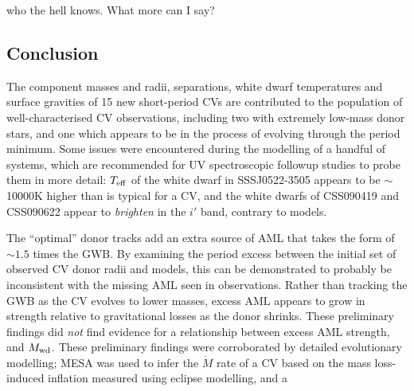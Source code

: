 \label{chpt:conclusion} %

who the hell knows. What more can I say?

\subsection{Conclusion}

The component masses and radii, separations, white dwarf temperatures and surface gravities of 15 new short-period CVs are contributed to the population of well-characterised CV observations, including two with extremely low-mass donor stars, and one which appears to be in the process of evolving through the period minimum.
Some issues were encountered during the modelling of a handful of systems, which are recommended for UV spectroscopic followup studies to probe them in more detail: $T_{\rm eff}$ of the white dwarf in SSSJ0522-3505 appears to be $\sim$10000K higher than is typical for a CV, and the white dwarfs of CSS090419 and CSS090622 appear to \textit{brighten} in the $i'$ band, contrary to models.

The ``optimal'' donor tracks add an extra source of AML that takes the form of $\sim 1.5$ times the GWB. By examining the period excess between the initial set of observed CV donor radii and models, this can be demonstrated to probably be inconsistent with the missing AML seen in observations.
Rather than tracking the GWB as the CV evolves to lower masses, excess AML appears to grow in strength relative to gravitational losses as the donor shrinks. These preliminary findings did {\it not} find evidence for a relationship between excess AML strength, and $M_{\rm wd}$.
These preliminary findings were corroborated by detailed evolutionary modelling; MESA was used to infer the $\dot M$ rate of a CV based on the mass loss-induced inflation measured using eclipse modelling, and a
